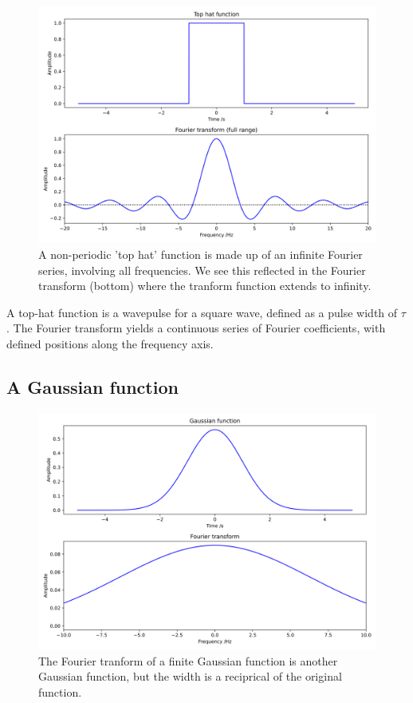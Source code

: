 \documentclass[
]{book}
\begin{document}
\begin{figure}

{\centering \includegraphics[width=0.7\linewidth]{visualisations/ch11-fttophat1} 

}

\caption{A non-periodic 'top hat' function is made up of an infinite Fourier series, involving all frequencies. We see this reflected in the Fourier transform (bottom) where the tranform function extends to infinity.}\label{fig:ch11-fttophat1}
\end{figure}

A top-hat function is a wavepulse for a square wave, defined as a pulse width of \(\tau\). The Fourier transform yields a continuous series of Fourier coefficients, with defined positions along the frequency axis.

\hypertarget{sec:ch11-ftgaussian}{%
\subsection{A Gaussian function}\label{sec:ch11-ftgaussian}}

\begin{figure}

{\centering \includegraphics[width=0.7\linewidth]{visualisations/ch11-ftgaussian1} 

}

\caption{The Fourier tranform of a finite Gaussian function is another Gaussian function, but the width is a reciprical of the original function.}\label{fig:ch11-ftgaussian1}
\end{figure}
\end{document}
